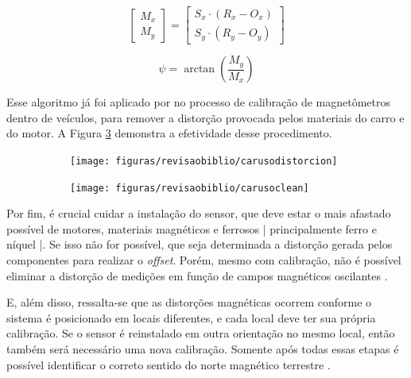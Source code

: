 \begin{equation}
	\left[\begin{array}{c}  M_x\\M_y \end{array}\right] = \left[\begin{array}{c} S_x \cdot\left(R_x - O_x\right)\\ S_y \cdot\left( R_y - O_y\right)\end{array}\right]
	\label{eq:magerrorcalibrationfinal2}
\end{equation}

\begin{equation}
	\psi = \arctan\left(\dfrac{M_y}{M_x}\right)
	\label{heading90gfinal}
\end{equation}

Esse algoritmo já foi aplicado por \cite{carusoSAE} no processo de calibração de magnetômetros dentro de veículos, para remover a distorção provocada pelos materiais do carro e do motor. A Figura \ref{fig:caruso} demonstra a efetividade desse procedimento.

\begin{figure}[!htb]
	\centering
	\captionsetup[subfigure]{justification=centering}
	\caption{Aplicação da calibração: (a) sinal original lido, (b) sinal lido após aplicação da calibração}
	\begin{subfigure}[b]{0.49\textwidth}
		\centering
		\texttt{[image: figuras/revisaobiblio/carusodistorcion]}
		\caption{}
		\label{fig:carusodistorcion}
	\end{subfigure}
	\hfill
	\begin{subfigure}[b]{0.49\textwidth}
		\centering
		\texttt{[image: figuras/revisaobiblio/carusoclean]}
		\caption{}
		\label{fig:carusoclean}
	\end{subfigure}
	\label{fig:caruso}
\end{figure}

Por fim, é crucial cuidar a instalação do sensor, que deve estar o mais afastado possível de motores, materiais magnéticos e ferrosos | principalmente ferro e níquel |. Se isso não for possível, que seja determinada a distorção gerada pelos componentes para realizar o \textit{offset}. Porém, mesmo com calibração, não é possível eliminar a distorção de medições em função de campos magnéticos oscilantes \cite{838300}. 

E, além disso, ressalta-se que as distorções magnéticas ocorrem conforme o sistema é posicionado em locais diferentes, e cada local deve ter sua própria calibração. Se o sensor é reinstalado em outra orientação no mesmo local, então também será necessário uma nova calibração. Somente após todas essas etapas é possível identificar o correto sentido do norte magnético terrestre \cite{838300}. 

